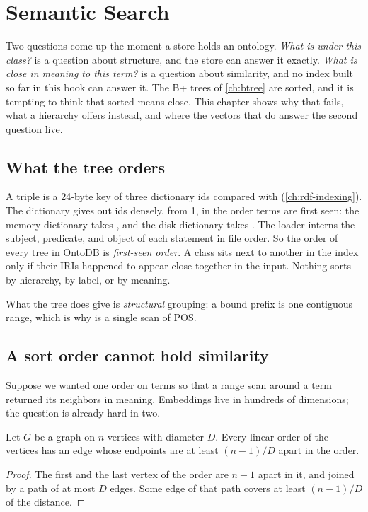 \chapter{Semantic Search}
\label{ch:semantic}

Two questions come up the moment a store holds an ontology. \emph{What is under
this class?} is a question about structure, and the store can answer it
exactly. \emph{What is close in meaning to this term?} is a question about
similarity, and no index built so far in this book can answer it. The B+ trees
of \cref{ch:btree} are sorted, and it is tempting to think that sorted means
close. This chapter shows why that fails, what a hierarchy offers instead,
and where the vectors that do answer the second question live.

\section{What the tree orders}

A triple is a 24-byte key of three dictionary ids compared with
 (\cref{ch:rdf-indexing}). The dictionary gives out ids densely, from
1, in the order terms are first seen: the memory dictionary takes
, and the disk dictionary takes . The loader
interns the subject, predicate, and object of each statement in file order. So
the order of every tree in OntoDB is \emph{first-seen order}. A class sits
next to another in the index only if their IRIs happened to appear close
together in the input. Nothing sorts by hierarchy, by label, or by meaning.

What the tree does give is \emph{structural} grouping: a bound prefix is one
contiguous range, which is why  is a single scan of POS.

\section{A sort order cannot hold similarity}

Suppose we wanted one order on terms so that a range scan around a term returned
its neighbors in meaning. Embeddings live in hundreds of dimensions; the
question is already hard in two.

\begin{lemma}[Bandwidth]\label{lem:bandwidth}
Let $G$ be a graph on $n$ vertices with diameter $D$. Every linear order of the
vertices has an edge whose endpoints are at least $(n-1)/D$ apart in the order.
\end{lemma}
\begin{proof}
The first and the last vertex of the order are $n-1$ apart in it, and joined by
a path of at most $D$ edges. Some edge of that path covers at least $(n-1)/D$ of
the distance.
\end{proof}

